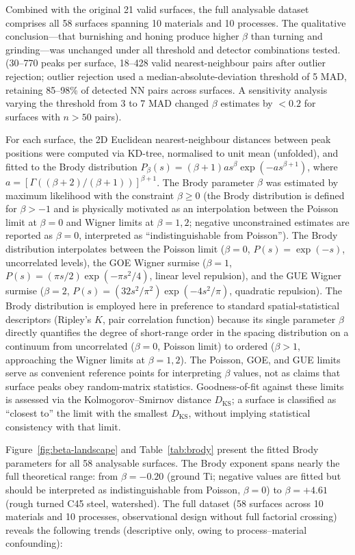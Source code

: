 \documentclass[final,1p,times]{elsarticle}
\theoremstyle{definition}
\begin{document}
Combined with the original 21 valid surfaces, the full analysable
dataset comprises all 58 surfaces spanning 10 materials and 10 processes.
The qualitative conclusion---that burnishing and honing produce higher
$\beta$ than turning and grinding---was unchanged under all threshold
and detector combinations tested.
(30--770 peaks per surface, 18--428 valid nearest-neighbour pairs
after outlier rejection; outlier rejection used a
median-absolute-deviation threshold of 5 MAD, retaining
85--98\% of detected NN pairs across surfaces. A sensitivity
analysis varying the threshold from 3 to 7 MAD changed
$\beta$ estimates by $< 0.2$ for surfaces with $n > 50$ pairs).

For each surface, the 2D Euclidean nearest-neighbour distances
between peak positions were computed via KD-tree, normalised to
unit mean (unfolded), and fitted to the Brody distribution
$P_\beta(s) = (\beta+1) a s^\beta \exp(-a s^{\beta+1})$, where
$a = [\Gamma((\beta+2)/(\beta+1))]^{\beta+1}$. The Brody
parameter $\beta$ was estimated by maximum likelihood with the
constraint $\beta \geq 0$ (the Brody distribution is defined
for $\beta > -1$ and is physically motivated as an interpolation
between the Poisson limit at $\beta=0$ and Wigner limits at
$\beta=1,2$; negative unconstrained estimates are reported as
$\beta = 0$, interpreted as ``indistinguishable from Poisson'').
The Brody distribution interpolates
between the Poisson limit ($\beta=0$, $P(s) = \exp(-s)$,
uncorrelated levels), the GOE Wigner surmise ($\beta=1$,
$P(s) = (\pi s/2) \exp(-\pi s^2/4)$, linear level repulsion),
and the GUE Wigner surmise ($\beta=2$,
$P(s) = (32 s^2/\pi^2) \exp(-4 s^2/\pi)$, quadratic repulsion).
The Brody distribution is employed here in preference to standard
spatial-statistical descriptors (Ripley's $K$, pair correlation
function) because its single parameter $\beta$ directly quantifies
the degree of short-range order in the spacing distribution on a
continuum from uncorrelated ($\beta=0$, Poisson limit) to
ordered ($\beta>1$, approaching the Wigner limits at
$\beta=1,2$). The Poisson, GOE, and GUE limits serve as
convenient reference points for interpreting $\beta$ values,
not as claims that surface peaks obey random-matrix statistics.
Goodness-of-fit against these limits is
assessed via the Kolmogorov--Smirnov distance $D_{\text{KS}}$;
a surface is classified as ``closest to'' the limit with the
smallest $D_{\text{KS}}$, without implying statistical consistency
with that limit.

Figure~\ref{fig:beta-landscape} and Table~\ref{tab:brody} present
the fitted Brody parameters for all 58 analysable surfaces. The Brody
exponent spans nearly the full theoretical range: from
$\beta = -0.20$ (ground Ti; negative values are fitted but
should be interpreted as indistinguishable from Poisson,
$\beta=0$) to
$\beta = +4.61$ (rough turned C45 steel, watershed). The full
dataset (58 surfaces across 10 materials and 10 processes,
observational design without full factorial crossing) reveals
the following trends (descriptive only, owing to process--material
confounding):
\end{document}
